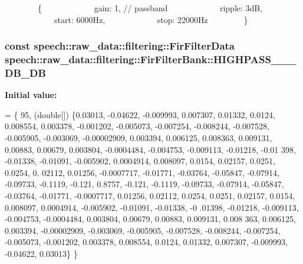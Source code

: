         \{             gain\+: 1, // passband             ripple\+: 3d\+B,             start\+: 6000\+Hz,             stop\+: 22000\+Hz         \} \hypertarget{classspeech_1_1raw__data_1_1filtering_1_1FirFilterBank_a3fe4a0224ec1af6c10d6cb760dd1d336}{
\subsubsection[{H\+I\+G\+H\+P\+A\+S\+S\+\_\+44100\+\_\+3000\+\_\+3\+D\+B\+\_\+80\+D\+B}]{\setlength{\rightskip}{0pt plus 5cm}const {\bf speech\+::raw\+\_\+data\+::filtering\+::\+Fir\+Filter\+Data} speech\+::raw\+\_\+data\+::filtering\+::\+Fir\+Filter\+Bank\+::\+H\+I\+G\+H\+P\+A\+S\+S\+\_\+\_\+\_\+D\+B\+\_\+D\+B\hspace{0.3cm}{\ttfamily [static]}}}\label{classspeech_1_1raw__data_1_1filtering_1_1FirFilterBank_a3fe4a0224ec1af6c10d6cb760dd1d336}
{\bfseries Initial value\+:}
\begin{DoxyCode}
= \{
        95,
        (\textcolor{keywordtype}{double}[]) \{0.03013, -0.04622, -0.009993, 0.007307, 0.01332, 0.0124, 0.008554, 0.003378, -0.001202,
       -0.005073,
                    -0.007254, -0.008244, -0.007528, -0.005905, -0.003069, -0.00002909, 0.003394, 0.006125,
       0.008363,
                    0.009131, 0.00883, 0.00679, 0.003804, -0.0004484, -0.004753, -0.009113, -0.01218, -0.01
      398,
                    -0.01338, -0.01091, -0.005902, 0.0004914, 0.008097, 0.0154, 0.02157, 0.0251, 0.0254, 0.
      02112,
                    0.01256, -0.0007717, -0.01771, -0.03764, -0.05847, -0.07914, -0.09733, -0.1119, -0.121,
       0.8757,
                    -0.121, -0.1119, -0.09733, -0.07914, -0.05847, -0.03764, -0.01771, -0.0007717, 0.01256,
       0.02112,
                    0.0254, 0.0251, 0.02157, 0.0154, 0.008097, 0.0004914, -0.005902, -0.01091, -0.01338, -0
      .01398,
                    -0.01218, -0.009113, -0.004753, -0.0004484, 0.003804, 0.00679, 0.00883, 0.009131, 0.008
      363,
                    0.006125, 0.003394, -0.00002909, -0.003069, -0.005905, -0.007528, -0.008244, -0.007254,
       -0.005073,
                    -0.001202, 0.003378, 0.008554, 0.0124, 0.01332, 0.007307, -0.009993, -0.04622, 0.03013\}
      \}
\end{DoxyCode}

